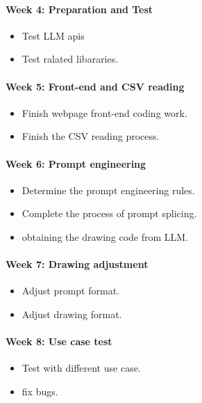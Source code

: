 \documentclass[conference]{IEEEtran}
\begin{document}
            \paragraph{Week 4: Preparation and Test}
                \begin{itemize}
                    \item Test LLM apis
                    \item Test ralated libararies.
                \end{itemize}

            \paragraph{Week 5: Front-end and CSV reading}
                \begin{itemize}
                    \item Finish webpage front-end coding work.
                    \item Finish the CSV reading process.
                \end{itemize}

            \paragraph{Week 6: Prompt engineering}
                \begin{itemize}
                    \item Determine the prompt engineering rules.
                    \item Complete the process of prompt splicing.
                    \item obtaining the drawing code from LLM.
                \end{itemize}

            \paragraph{Week 7: Drawing adjustment}
                \begin{itemize}
                    \item Adjust prompt format.
                    \item Adjust drawing format.
                \end{itemize}

            \paragraph{Week 8: Use case test}
                \begin{itemize}
                    \item Test with different use case.
                    \item fix bugs.
                \end{itemize}
\end{document}
